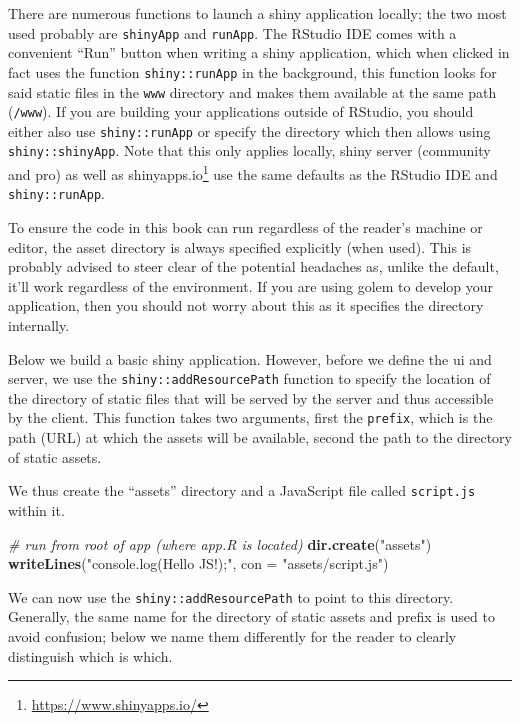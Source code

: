 \documentclass[
]{krantz}
\makeatletter
\newenvironment{Shaded}{\begin{snugshade}}{\end{snugshade}}
\newcommand{\CommentTok}[1]{\textcolor[rgb]{0.37,0.37,0.37}{\textit{#1}}}
\newcommand{\DataTypeTok}[1]{\textcolor[rgb]{0.27,0.27,0.27}{#1}}
\newcommand{\KeywordTok}[1]{\textcolor[rgb]{0.27,0.27,0.27}{\textbf{#1}}}
\newcommand{\NormalTok}[1]{#1}
\newcommand{\StringTok}[1]{\textcolor[rgb]{0.5,0.5,0.5}{#1}}
\renewcommand{\href}[2]{#2\footnote{\url{#1}}}
\newenvironment{kframe}{%
\medskip{}
\setlength{\fboxsep}{.8em}
 \def\at@end@of@kframe{}%
 \ifinner\ifhmode%
  \def\at@end@of@kframe{\end{minipage}}%
  \begin{minipage}{\columnwidth}%
 \fi\fi%
 \def\FrameCommand##1{\hskip\@totalleftmargin \hskip-\fboxsep
 \colorbox{shadecolor}{##1}\hskip-\fboxsep
     \hskip-\linewidth \hskip-\@totalleftmargin \hskip\columnwidth}%
 \MakeFramed {\advance\hsize-\width
   \@totalleftmargin\z@ \linewidth\hsize
   \@setminipage}}%
 {\par\unskip\endMakeFramed%
 \at@end@of@kframe}
\renewenvironment{Shaded}{\begin{kframe}}{\end{kframe}}
\makeatother
\begin{document}
There are numerous functions to launch a shiny application locally; the two most used probably are \texttt{shinyApp} and \texttt{runApp}. The RStudio IDE comes with a convenient ``Run'' button when writing a shiny application, which when clicked in fact uses the function \texttt{shiny::runApp} in the background, this function looks for said static files in the \texttt{www} directory and makes them available at the same path (\texttt{/www}). If you are building your applications outside of RStudio, you should either also use \texttt{shiny::runApp} or specify the directory which then allows using \texttt{shiny::shinyApp}. Note that this only applies locally, shiny server (community and pro) as well as \href{https://www.shinyapps.io/}{shinyapps.io} use the same defaults as the RStudio IDE and \texttt{shiny::runApp}.

To ensure the code in this book can run regardless of the reader's machine or editor, the asset directory is always specified explicitly (when used). This is probably advised to steer clear of the potential headaches as, unlike the default, it'll work regardless of the environment. If you are using golem \citep{R-golem} to develop your application, then you should not worry about this as it specifies the directory internally.

Below we build a basic shiny application. However, before we define the ui and server, we use the \texttt{shiny::addResourcePath} function to specify the location of the directory of static files that will be served by the server and thus accessible by the client. This function takes two arguments, first the \texttt{prefix}, which is the path (URL) at which the assets will be available, second the path to the directory of static assets.

We thus create the ``assets'' directory and a JavaScript file called \texttt{script.js} within it.

\begin{Shaded}
\begin{Highlighting}[]
\CommentTok{\# run from root of app (where app.R is located)}
\KeywordTok{dir.create}\NormalTok{(}\StringTok{"assets"}\NormalTok{)}
\KeywordTok{writeLines}\NormalTok{(}\StringTok{"console.log(\textquotesingle{}Hello JS!\textquotesingle{});"}\NormalTok{, }\DataTypeTok{con =} \StringTok{"assets/script.js"}\NormalTok{)}
\end{Highlighting}
\end{Shaded}

We can now use the \texttt{shiny::addResourcePath} to point to this directory. Generally, the same name for the directory of static assets and prefix is used to avoid confusion; below we name them differently for the reader to clearly distinguish which is which.
\end{document}
